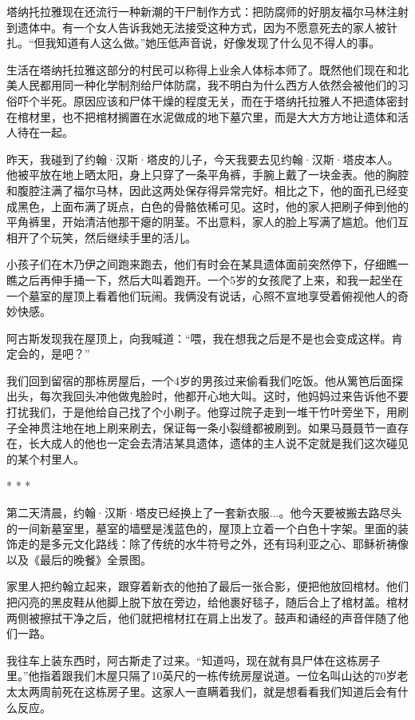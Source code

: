\documentclass[12pt,oneside]{book}
\begin{document}
塔纳托拉雅现在还流行一种新潮的干尸制作方式：把防腐师的好朋友福尔马林注射到遗体中。有一个女人告诉我她无法接受这种方式，因为不愿意死去的家人被针扎。“但我知道有人这么做。”她压低声音说，好像发现了什么见不得人的事。

生活在塔纳托拉雅这部分的村民可以称得上业余人体标本师了。既然他们现在和北美人民都用同一种化学制剂给尸体防腐，我不明白为什么西方人依然会被他们的习俗吓个半死。原因应该和尸体干燥的程度无关，而在于塔纳托拉雅人不把遗体密封在棺材里，也不把棺材搁置在水泥做成的地下墓穴里，而是大大方方地让遗体和活人待在一起。

昨天，我碰到了约翰·汉斯·塔皮的儿子，今天我要去见约翰·汉斯·塔皮本人。他被平放在地上晒太阳，身上只穿了一条平角裤，手腕上戴了一块金表。他的胸腔和腹腔注满了福尔马林，因此这两处保存得异常完好。相比之下，他的面孔已经变成黑色，上面布满了斑点，白色的骨骼依稀可见。这时，他的家人把刷子伸到他的平角裤里，开始清洁他那干瘪的阴茎。不出意料，家人的脸上写满了尴尬。他们互相开了个玩笑，然后继续手里的活儿。

小孩子们在木乃伊之间跑来跑去，他们有时会在某具遗体面前突然停下，仔细瞧一瞧之后再伸手捅一下，然后大叫着跑开。一个5岁的女孩爬了上来，和我一起坐在一个墓室的屋顶上看着他们玩闹。我俩没有说话，心照不宣地享受着俯视他人的奇妙快感。

阿古斯发现我在屋顶上，向我喊道：“喂，我在想我之后是不是也会变成这样。肯定会的，是吧？”

我们回到留宿的那栋房屋后，一个4岁的男孩过来偷看我们吃饭。他从篱笆后面探出头，每次我回头冲他做鬼脸时，他都开心地大叫。这时，他妈妈过来告诉他不要打扰我们，于是他给自己找了个小刷子。他穿过院子走到一堆干竹叶旁坐下，用刷子全神贯注地在地上刷来刷去，保证每一条小裂缝都被刷到。如果马聂聂节一直存在，长大成人的他也一定会去清洁某具遗体，遗体的主人说不定就是我们这次碰见的某个村里人。

\begin{center}
* * *
\end{center}

第二天清晨，约翰·汉斯·塔皮已经换上了一套新衣服...。他今天要被搬去路尽头的一间新墓室里，墓室的墙壁是浅蓝色的，屋顶上立着一个白色十字架。里面的装饰走的是多元文化路线：除了传统的水牛符号之外，还有玛利亚之心、耶稣祈祷像以及《最后的晚餐》全景图。

家里人把约翰立起来，跟穿着新衣的他拍了最后一张合影，便把他放回棺材。他们把闪亮的黑皮鞋从他脚上脱下放在旁边，给他裹好毯子，随后合上了棺材盖。棺材两侧被擦拭干净之后，他们就把棺材扛在肩上出发了。鼓声和诵经的声音伴随了他们一路。

我往车上装东西时，阿古斯走了过来。“知道吗，现在就有具尸体在这栋房子里。”他指着跟我们木屋只隔了10英尺的一栋传统房屋说道。一位名叫山达的70岁老太太两周前死在这栋房子里。这家人一直瞒着我们，就是想看看我们知道后会有什么反应。
\end{document}
